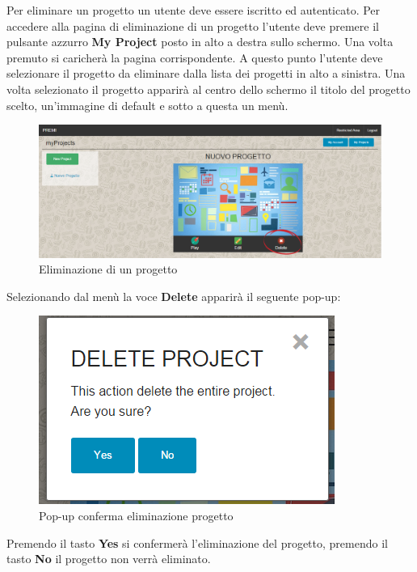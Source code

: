 Per eliminare un progetto un utente deve essere iscritto ed autenticato. Per accedere alla pagina di eliminazione di un progetto l'utente deve premere il pulsante azzurro \textbf{My Project} posto in alto a destra sullo schermo. Una volta premuto si caricherà la pagina corrispondente. A questo punto l'utente deve selezionare il progetto da eliminare dalla lista dei progetti in alto a sinistra.
Una volta selezionato il progetto apparirà al centro dello schermo il titolo del progetto scelto, un'immagine di default e sotto a questa un menù. 

\begin{figure}[H] 
	\centering 
	\includegraphics[scale=0.40] {img/elimina_pro.png}
	\caption{Eliminazione di un progetto} 
\end{figure}

Selezionando dal menù la voce \textbf{Delete} apparirà il seguente pop-up:

\begin{figure}[H] 
	\centering 
	\includegraphics[scale=0.60] {img/del_project.png}
	\caption{Pop-up conferma eliminazione progetto} 
\end{figure}

\noindent Premendo il tasto \textbf{Yes} si confermerà l'eliminazione del progetto, premendo il tasto \textbf{No} il progetto non verrà eliminato.